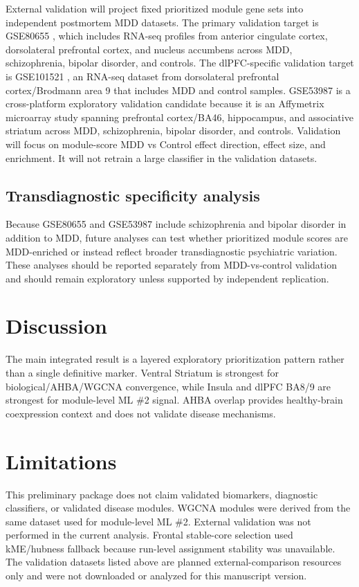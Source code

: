 \documentclass[11pt]{article}
\begin{document}
External validation will project fixed prioritized module gene sets into independent postmortem MDD datasets. The primary validation target is GSE80655 \citep{Ramaker2017}, which includes RNA-seq profiles from anterior cingulate cortex, dorsolateral prefrontal cortex, and nucleus accumbens across MDD, schizophrenia, bipolar disorder, and controls. The dlPFC-specific validation target is GSE101521 \citep{Pantazatos2017}, an RNA-seq dataset from dorsolateral prefrontal cortex/Brodmann area 9 that includes MDD and control samples. GSE53987 \citep{Lanz2019} is a cross-platform exploratory validation candidate because it is an Affymetrix microarray study spanning prefrontal cortex/BA46, hippocampus, and associative striatum across MDD, schizophrenia, bipolar disorder, and controls. Validation will focus on module-score MDD vs Control effect direction, effect size, and enrichment. It will not retrain a large classifier in the validation datasets.

\subsection{Transdiagnostic specificity analysis}

Because GSE80655 and GSE53987 include schizophrenia and bipolar disorder in addition to MDD, future analyses can test whether prioritized module scores are MDD-enriched or instead reflect broader transdiagnostic psychiatric variation. These analyses should be reported separately from MDD-vs-control validation and should remain exploratory unless supported by independent replication.

\section{Discussion}

The main integrated result is a layered exploratory prioritization pattern rather than a single definitive marker. Ventral Striatum is strongest for biological/AHBA/WGCNA convergence, while Insula and dlPFC BA8/9 are strongest for module-level ML \#2 signal. AHBA overlap provides healthy-brain coexpression context and does not validate disease mechanisms.

\section{Limitations}

This preliminary package does not claim validated biomarkers, diagnostic classifiers, or validated disease modules. WGCNA modules were derived from the same dataset used for module-level ML \#2. External validation was not performed in the current analysis. Frontal stable-core selection used kME/hubness fallback because run-level assignment stability was unavailable. The validation datasets listed above are planned external-comparison resources only and were not downloaded or analyzed for this manuscript version.
\end{document}
